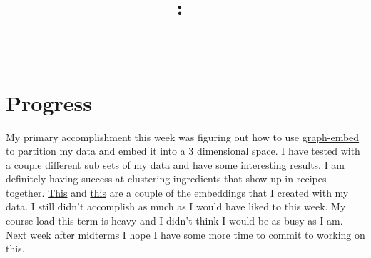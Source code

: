 \documentclass{article}
\title{
    \vspace{2in}
    \textmd{\textbf{\hmwkClass:\ \hmwkTitle}}\\
    \normalsize\vspace{0.1in}\small{\hmwkDueDate}\\
    \vspace{0.1in}\large{\textit{\hmwkClassInstructor}}
    \vspace{3in}
}
\author{\hmwkAuthorName}
\date{}
\begin{document}
\maketitle
\pagebreak

\section{Progress}
My primary accomplishment this week was figuring out how to use \href{https://github.com/LLNL/graph-embed/}
{graph-embed} to partition my data and embed it into a 3 dimensional space. I have tested with a couple
different sub sets of my data and have some interesting results. I am definitely having success at
clustering ingredients that show up in recipes together.
\href{http://web.cecs.pdx.edu/~ajn6/recipe/plot1.html}{This} and
\href{http://web.cecs.pdx.edu/~ajn6/recipe/plot2.html}{this} are a couple of the embeddings that I created with my data.
I still didn't accomplish as much as I would have liked to this week. My course load this term is heavy and
I didn't think I would be as busy as I am. Next week after midterms I hope I have some more time to commit
to working on this.
\end{document}
